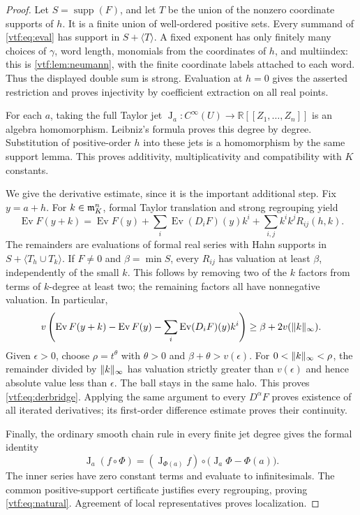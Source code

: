 \documentclass[11pt,letterpaper]{article}
\theoremstyle{definition}
\theoremstyle{remark}
\newcommand{\R}{\mathbb R}\newcommand{\C}{\mathbb C}
\newcommand{\supp}{\operatorname{supp}}\newcommand{\st}{\operatorname{st}}
\newcommand{\ev}{\operatorname{Ev}}\newcommand{\jet}{\operatorname{J}}
\begin{document}
\begin{proof}
Let $S=\supp(F)$, and let $T$ be the union of the nonzero coordinate supports
of $h$. It is a finite union of well-ordered positive sets. Every summand of
\eqref{vtf:eq:eval} has support in $S+\langle T\rangle$. A fixed exponent has
only finitely many choices of $\gamma$, word length, monomials from the
coordinates of $h$, and multiindex: this is \cref{vtf:lem:neumann}, with the
finite coordinate labels attached to each word. Thus the displayed double
sum is strong. Evaluation at $h=0$ gives the asserted restriction and proves
injectivity by coefficient extraction on all real points.

For each $a$, taking the full Taylor jet
$\jet_a:C^\infty(U)\to\R[[Z_1,\ldots,Z_n]]$ is an algebra homomorphism.
Leibniz's formula proves this degree by degree. Substitution of positive-order
$h$ into these jets is a homomorphism by the same support lemma. This proves
additivity, multiplicativity and compatibility with $K$ constants.

We give the derivative estimate, since it is the important additional step.
Fix $y=a+h$. For $k\in\mathfrak m_K^n$, formal Taylor translation and strong
regrouping yield
\begin{equation}\label{vtf:eq:remainder}
 \ev F(y+k)=\ev F(y)+\sum_i\ev(D_iF)(y)k^i
             +\sum_{i,j}k^ik^j R_{ij}(h,k).
\end{equation}
The remainders are evaluations of formal real series with Hahn supports in
$S+\langle T_h\cup T_k\rangle$. If $F\ne0$ and $\beta=\min S$, every
$R_{ij}$ has valuation at least $\beta$, independently of the small $k$.
This follows by removing two of the $k$ factors from terms of $k$-degree at
least two; the remaining factors all have nonnegative valuation. In
particular,
\[
 v\left(\ev F(y+k)-\ev F(y)-\sum_i\ev(D_iF)(y)k^i\right)
 \ge\beta+2v(\norm{k}_\infty).
\]
Given $\epsilon>0$, choose $\rho=t^\theta$ with $\theta>0$ and
$\beta+\theta>v(\epsilon)$. For $0<\lVert k\rVert_\infty<\rho$, the
remainder divided by $\lVert k\rVert_\infty$ has valuation strictly greater than
$v(\epsilon)$ and hence absolute value less than $\epsilon$. The ball stays
in the same halo. This proves \eqref{vtf:eq:derbridge}. Applying the same argument
to every $D^\alpha F$ proves existence of all iterated derivatives; its
first-order difference estimate proves their continuity.

Finally, the ordinary smooth chain rule in every finite jet degree gives the
formal identity
\[
 \jet_a(f\circ\Phi)=
 (\jet_{\Phi(a)}f)\circ\bigl(\jet_a\Phi-\Phi(a)\bigr).
\]
The inner series have zero constant terms and evaluate to infinitesimals.
The common positive-support certificate justifies every regrouping, proving
\eqref{vtf:eq:natural}. Agreement of local representatives proves localization.
\end{proof}
\end{document}
